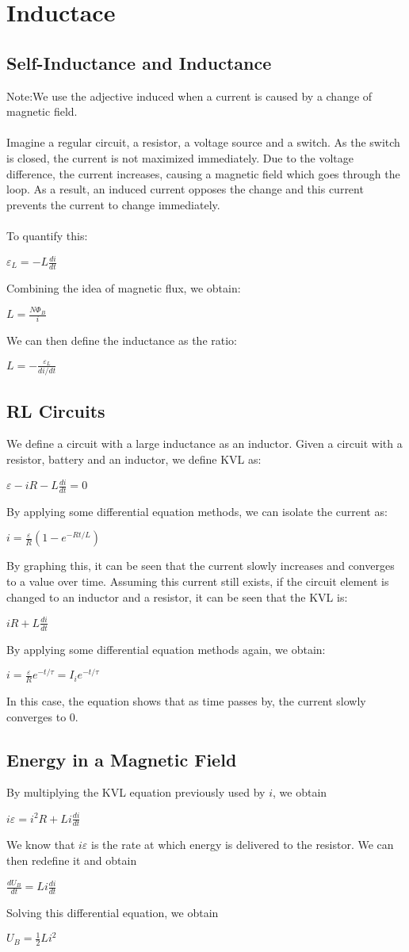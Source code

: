 \documentclass{report}
\begin{document}
\chapter{Inductace}
	\section{Self-Inductance and Inductance}
		Note:We use the adjective induced when a current is caused by a change of magnetic field.\\
		\\
		Imagine a regular circuit, a resistor, a voltage source and a switch. As the switch is closed, the current is not maximized immediately. Due to the voltage difference, the current increases, causing a magnetic field which goes through the loop. As a result, an induced current opposes the change and this current prevents the current to change immediately.\\
		\\
		To quantify this:\\
		\centerline{$\varepsilon_L = -L\frac{di}{dt}$}
		Combining the idea of magnetic flux, we obtain:\\
		\centerline{$L = \frac{N\Phi_B}{i}$}
		We can then define the inductance as the ratio:\\
		\centerline{$L = -\frac{\varepsilon_L}{di/dt}$}
	\section{RL Circuits}
		We define a circuit with a large inductance as an inductor. Given a circuit with a resistor, battery and an inductor, we define KVL as:\\
		\centerline{$\varepsilon - iR - L\frac{di}{dt} = 0$}
		By applying some differential equation methods, we can isolate the current as:\\
		\centerline{$ i = \frac{\varepsilon}{R} (1 - e^{-Rt/L})$}
		By graphing this, it can be seen that the current slowly increases and converges to a value over time. Assuming this current still exists, if the circuit element is changed to an inductor and a resistor, it can be seen that the KVL is:\\
		\centerline{$iR + L\frac{di}{dt}$}
		By applying some differential equation methods again, we obtain:\\
		\centerline{$i = \frac{\varepsilon}{R}e^{-t/\tau} = I_ie^{-t/\tau}$}
		In this case, the equation shows that as time passes by, the current slowly converges to 0.
	\section{Energy in a Magnetic Field}
		By multiplying the KVL equation previously used by $i$, we obtain\\
		\centerline{$i\varepsilon = i^2R + Li\frac{di}{dt}$}
		We know that $i\varepsilon$ is the rate at which energy is delivered to the resistor. We can then redefine it and obtain\\
		\centerline{$\frac{dU_B}{dt} = Li\frac{di}{dt}$}
		Solving this differential equation, we obtain\\
		\centerline{$U_B = \frac{1}{2} Li^2$}
\end{document}
